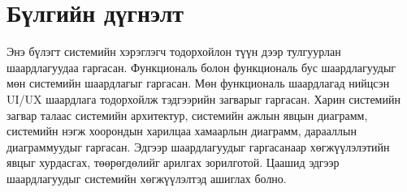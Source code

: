 \section{Бүлгийн дүгнэлт}

Энэ бүлэгт системийн хэрэглэгч тодорхойлон түүн дээр тулгуурлан шаардлагуудаа гаргасан. 
Функциональ болон функциональ бус шаардлагуудыг мөн системийн шаардлагыг гаргасан.
Мөн функциональ шаардлагад нийцсэн UI/UX шаардлага тодорхойлж тэдгээрийн загварыг гаргасан.
Харин системийн загвар талаас системийн архитектур, системийн ажлын явцын диаграмм, системийн нэгж 
хоорондын харилцаа хамаарлын диаграмм, дарааллын диаграммуудыг гаргасан.
Эдгээр шаардлагуудыг гаргасанаар хөгжүүлэлэтийн явцыг хурдасгах, төөрөгдөлийг арилгах зорилготой.
Цаашид эдгээр шаардлагуудыг системийн хөгжүүлэлтэд ашиглах болно.
